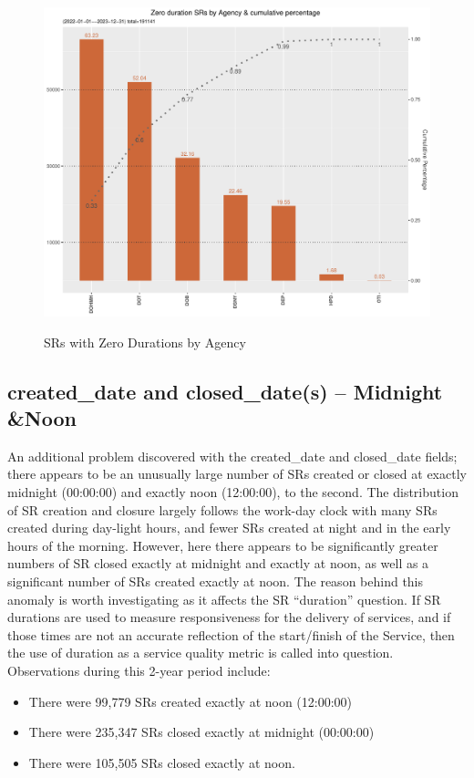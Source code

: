 \documentclass[12pt, titlepage]{article}
\begin{document}
{	\begin{figure}[tbp]
		 \centering
		  \caption{SRs with Zero Durations by Agency}
		 \includegraphics[width = \textwidth]{zero_duration_SR.pdf}
		 \label{fig:sero-duration}
	\end{figure}	
		
	\subsection{created\_date and closed\_date(s) -- Midnight \&Noon}
	An additional problem discovered with the created\_date and closed\_date fields; there appears to be an unusually large number of 
	SRs created or closed at exactly midnight (00:00:00) and exactly noon (12:00:00), to the second. The distribution of SR creation and closure 
	largely follows the work-day clock with many SRs created during day-light hours, and fewer SRs 
	created at night and in the early hours of the morning. 
	However, here there appears to be significantly greater numbers of SR closed exactly at midnight and exactly at noon,
	as well as a significant number of SRs created exactly at noon. The reason behind this anomaly is worth investigating 
	as it affects the SR ``duration'' question. If SR durations are used to measure responsiveness
	for the delivery of services, and if those times are not an accurate reflection of the start/finish of the Service, then the use of
	duration as a service quality metric is called into question. Observations during this 2-year period include:
	
	\begin{itemize}
		    \item There were 99,779 SRs created exactly at noon (12:00:00)
		    \item There were 235,347 SRs closed exactly at midnight (00:00:00)
		    \item There were 105,505 SRs closed exactly at noon. 
	\end{itemize}
	
}
\end{document}
